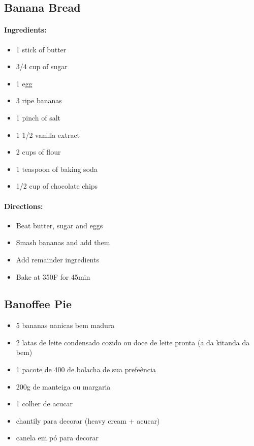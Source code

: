 \documentclass{article}
\begin{document}


\subsection{Banana Bread}

\paragraph{Ingredients:}

\begin{itemize}
	\item 1 stick of butter
	\item 3/4 cup of sugar
	\item 1 egg
	\item 3 ripe bananas
	\item 1 pinch of salt
	\item 1 1/2 vanilla extract
	\item 2 cups of flour
	\item 1 teaspoon of baking soda
	\item 1/2 cup of chocolate chips
\end{itemize}

\paragraph{Directions:}
\begin{itemize}
	\item Beat butter, sugar and eggs
	\item Smash bananas and add them
	\item Add remainder ingredients
	\item Bake at 350F for 45min
\end{itemize}


\subsection{Banoffee Pie}

\begin{itemize}
	\item 5 bananas nanicas bem madura
	\item 2 latas de leite condensado cozido ou doce de leite pronta (a da kitanda da bem)
	\item 1 pacote de 400 de bolacha de sua prefeência
	\item 200g de manteiga ou margaria
	\item 1 colher de acucar
	\item chantily para decorar (heavy cream + acucar)
	\item canela em pó para decorar
\end{itemize}
\end{document}
